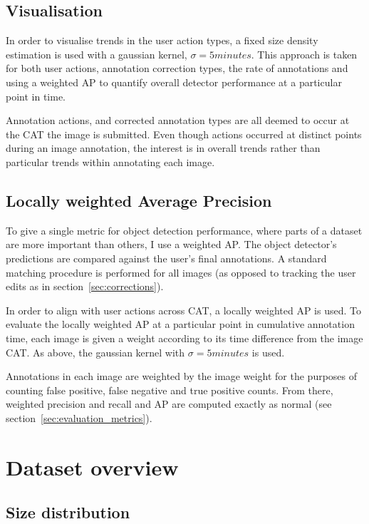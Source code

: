 \subsection{Visualisation}
\label{sec:visualisation}

In order to visualise trends in the user action types, a fixed size density estimation is used with a gaussian kernel, $\sigma=5 minutes$. This approach is taken for both user actions, annotation correction types, the rate of annotations and using a weighted \gls{AP} to quantify overall detector performance at a particular point in  time.

Annotation actions, and corrected annotation types are all deemed to occur at the \gls{CAT} the image is submitted. Even though actions occurred at distinct points during an image annotation, the interest is in overall trends rather than particular trends within annotating each image. 

\subsection {Locally weighted Average Precision}
\label{sec:noisy_trends}

To give a single metric for object detection performance, where parts of a dataset are more important than others, I use a weighted \gls{AP}. The object detector's predictions are compared against the user's final annotations. A standard matching procedure is performed for all images (as opposed to tracking the user edits as in section~\ref{sec:corrections}).

In order to align with user actions across \gls{CAT}, a locally weighted \gls{AP} is used. To evaluate the locally weighted \gls{AP} at a particular point in cumulative annotation time, each image is given a weight according to its time difference from the image \gls{CAT}. As above, the gaussian kernel with $\sigma=5 minutes$ is used.

Annotations in each image are weighted by the image weight for the purposes of counting false positive, false negative and true positive counts. From there, weighted precision and recall and \gls{AP} are computed exactly as normal (see section~\ref{sec:evaluation_metrics}).


\section {Dataset overview}
\subsection {Size distribution}

